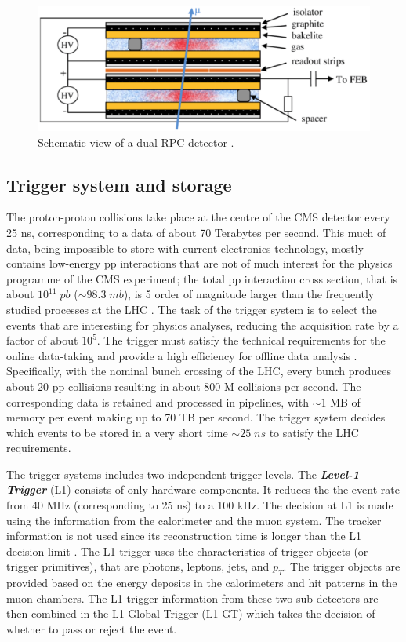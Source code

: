 \begin{figure}[ht]
	\centering
	\includegraphics[width=\textwidth]{rpc.png}
	\vspace{2mm}
	\caption[Schematic view of a dual RPC detector.]{Schematic view of a dual RPC detector \cite{IanCrotty}.}
	\label{rpc}
\end{figure}

\subsection{Trigger system and storage}

The proton-proton collisions take place at the centre of the CMS detector every 25 ns, corresponding to a data of about 70 Terabytes per second. This much of data, being impossible to store with current electronics technology, mostly contains low-energy pp interactions that are not of much interest for the physics programme of the CMS experiment; the total pp interaction cross section, that is about $10^{11} \; pb$ ($\sim98.3 \; mb$), is 5 order of magnitude larger than the frequently studied processes at the LHC \cite{ppxsec}. The task of the trigger system is to select the events that are interesting for physics analyses, reducing the acquisition rate by a factor of about $10^5$. The trigger must satisfy the technical requirements for the online data-taking and provide a high efficiency for offline data analysis \cite{Khachatryan_2017}. Specifically, with the nominal bunch crossing of the LHC, every bunch produces about 20 pp collisions resulting in about 800 M collisions per second. The corresponding data is retained and processed in pipelines, with $\sim1$ MB of memory per event making up to 70 TB per second. The trigger system decides which events to be stored in a very short time $\sim 25 \; ns$ to satisfy the LHC requirements.

The trigger systems includes two independent trigger levels. The \emph{\textbf{Level-1 Trigger}} (L1) consists of only hardware components. It reduces the the event rate from 40 MHz (corresponding to 25 ns) to a 100 kHz. The decision at L1 is made using the information from the calorimeter and the muon system. The tracker information is not used since its reconstruction time is longer than the L1 decision limit \cite{Cittolin:578006}. The L1 trigger uses the characteristics of trigger objects (or trigger primitives), that are photons, leptons, jets, and $p_T$. The trigger objects are provided based on the energy deposits in the calorimeters and hit patterns in the muon chambers. The L1 trigger information from these two sub-detectors are then combined in the L1 Global Trigger (L1 GT) which takes the decision of whether to pass or reject the event.

